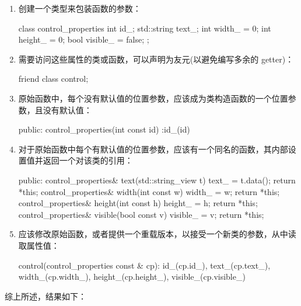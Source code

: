 \begin{enumerate}
\item
创建一个类型来包装函数的参数：

\begin{cpp}
class control_properties
{
    int id_;
    std::string text_;
    int width_ = 0;
    int height_ = 0;
    bool visible_ = false;
};
\end{cpp}

\item
需要访问这些属性的类或函数，可以声明为友元(以避免编写多余的 getter)：

\begin{cpp}
friend class control;
\end{cpp}

\item
原始函数中，每个没有默认值的位置参数，应该成为类构造函数的一个位置参数，且没有默认值：

\begin{cpp}
public:
    control_properties(int const id) :id_(id)
    {}
\end{cpp}

\item
对于原始函数中每个有默认值的位置参数，应该有一个同名的函数，其内部设置值并返回一个对该类的引用：

\begin{cpp}
public:
    control_properties& text(std::string_view t)
    { text_ = t.data(); return *this; }
    control_properties& width(int const w)
    { width_ = w; return *this; }
    control_properties& height(int const h)
    { height_ = h; return *this; }
    control_properties& visible(bool const v)
    { visible_ = v; return *this; }
\end{cpp}

\item
应该修改原始函数，或者提供一个重载版本，以接受一个新类的参数，从中读取属性值：

\begin{cpp}
control(control_properties const & cp):
    id_(cp.id_),
    text_(cp.text_),
    width_(cp.width_),
    height_(cp.height_),
    visible_(cp.visible_)
{}
\end{cpp}
\end{enumerate}

综上所述，结果如下：


